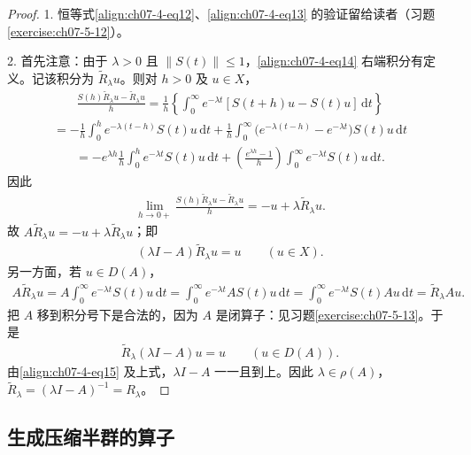 \documentclass[../../main.tex]{subfiles}
\begin{document}
\begin{proof}
1. 恒等式\eqref{align:ch07-4-eq12}、\eqref{align:ch07-4-eq13} 的验证留给读者（习题\cref{exercise:ch07-5-12}）。

2. 首先注意：由于 $\lambda>0$ 且 $\|S(t)\|\leqslant 1$，\eqref{align:ch07-4-eq14} 右端积分有定义。记该积分为 $\widetilde{R}_\lambda u$。则对 $h>0$ 及 $u\in X$，
\begin{align*}
\frac{S(h)\widetilde{R}_\lambda u-\widetilde{R}_\lambda u}{h}
=\frac{1}{h}\left\{\int_0^\infty e^{-\lambda t}[S(t+h)u-S(t)u]\,\mathrm{d}t\right\}
\end{align*}
\begin{align*}
=-\frac{1}{h}\int_0^h e^{-\lambda(t-h)}S(t)u\,\mathrm{d}t+\frac{1}{h}\int_0^\infty\bigl(e^{-\lambda(t-h)}-e^{-\lambda t}\bigr)S(t)u\,\mathrm{d}t
\end{align*}
\begin{align*}
=-e^{\lambda h}\frac{1}{h}\int_0^h e^{-\lambda t}S(t)u\,\mathrm{d}t+\left(\frac{e^{\lambda h}-1}{h}\right)\int_0^\infty e^{-\lambda t}S(t)u\,\mathrm{d}t.
\end{align*}
因此
\begin{align*}
\lim_{h\to 0+}\frac{S(h)\widetilde{R}_\lambda u-\widetilde{R}_\lambda u}{h}=-u+\lambda\widetilde{R}_\lambda u.
\end{align*}
故 $A\widetilde{R}_\lambda u=-u+\lambda\widetilde{R}_\lambda u$；即
\begin{align}
(\lambda I-A)\widetilde{R}_\lambda u=u\qquad (u\in X).\label{align:ch07-4-eq15}
\end{align}
另一方面，若 $u\in D(A)$，
\begin{align}
A\widetilde{R}_\lambda u=A\int_0^\infty e^{-\lambda t}S(t)u\,\mathrm{d}t=\int_0^\infty e^{-\lambda t}AS(t)u\,\mathrm{d}t
=\int_0^\infty e^{-\lambda t}S(t)Au\,\mathrm{d}t=\widetilde{R}_\lambda Au.\label{align:ch07-4-eq16}
\end{align}
把 $A$ 移到积分号下是合法的，因为 $A$ 是闭算子：见习题\cref{exercise:ch07-5-13}。于是
\begin{align*}
\widetilde{R}_\lambda(\lambda I-A)u=u\qquad (u\in D(A)).
\end{align*}
由\eqref{align:ch07-4-eq15} 及上式，$\lambda I-A$ 一一且到上。因此 $\lambda\in\rho(A)$，$\widetilde{R}_\lambda=(\lambda I-A)^{-1}=R_\lambda$。
\end{proof}

\subsection{生成压缩半群的算子}\label{subsection:ch07-4-2-生成压缩半群}
\end{document}
